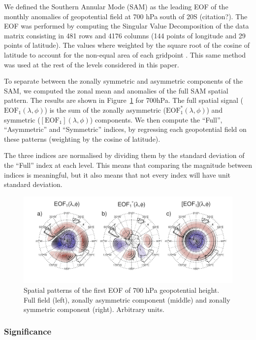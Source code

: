 \documentclass[twocol]{ametsocV5}
\begin{document}
We defined the Southern Annular Mode (SAM) as the leading EOF of the
monthly anomalies of geopotential field at 700 hPa south of 20\degree S
(citation?). The EOF was performed by computing the Singular Value
Decomposition of the data matrix consisting in 481 rows and 4176 columns
(144 points of longitude and 29 points of latitude). The values where
weighted by the square root of the cosine of latitude to account for the
non-equal area of each gridpoint \citep{chung1999}. This same method was
used at the rest of the levels considered in this paper.

To separate between the zonally symmetric and asymmetric components of
the SAM, we computed the zonal mean and anomalies of the full SAM
spatial pattern. The results are shown in Figure~\ref{fig:method} for
700hPa. The full spatial signal (\(\mathrm{EOF_1}(\lambda, \phi)\)) is
the sum of the zonally asymmetric (\(\mathrm{EOF_1^*}(\lambda, \phi)\))
and symmetric (\([\mathrm{EOF_1}](\lambda, \phi)\)) components. We then
compute the ``Full'', ``Asymmetric'' and ``Symmetric'' indices, by
regressing each geopotential field on these patterns (weighting by the
cosine of latitude).

The three indices are normalised by dividing them by the standard
deviation of the ``Full'' index at each level. This means that comparing
the magnitude between indices is meaningful, but it also means that not
every index will have unit standard deviation.

\begin{figure}
\includegraphics{method-1} \caption[Spatial patterns of the first EOF of 700 hPa geopotential height]{Spatial patterns of the first EOF of 700 hPa geopotential height. Full field (left), zonally asymmetric component (middle) and zonally symmetric component (right). Arbitrary units.}\label{fig:method}
\end{figure}

\subsubsection{Significance}
\end{document}
